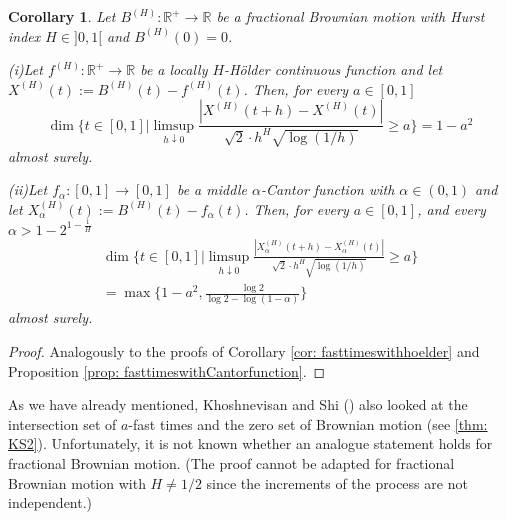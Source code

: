 \documentclass[11pt, reqno]{amsart}
\theoremstyle{plain}
\newtheorem{corollary}[theorem]{Corollary}
\theoremstyle{definition}
\theoremstyle{remark}
\begin{document}
\begin{corollary}
Let $B^{(H)} \colon \mathbb{R}^+ \to \mathbb{R}$ be a fractional Brownian motion with Hurst index $H\in]0,1[$ and $B^{(H)}(0)=0$.

(i)Let $f^{(H)} \colon \mathbb{R}^+ \to \mathbb{R}$ be a locally $H$-{H\"{o}lder } continuous function and let $X^{(H)}(t):= B^{(H)}(t)-f^{(H)}(t)$. Then, for every $a\in[0,1]$
\[
\dim \Big\{ t\in[0,1] \Big| \limsup_{h \downarrow 0} \frac{|X^{(H)}(t+h)-X^{(H)}(t)|}{\sqrt{2}\cdot h^{H}\sqrt{\log{(1/h)}}} \geq a \Big\} = 1-a^2
\]
almost surely.

(ii)Let $f_\alpha \colon [0,1] \to [0,1]$ be a middle $\alpha$-Cantor function with $\alpha \in(0,1)$ and let $X^{(H)}_\alpha(t):= B^{(H)}(t)-f_\alpha(t)$. Then, for every $a\in[0,1]$, and every $\alpha > 1 - 2^{1- \frac{1}{H}}$
\begin{multline*}
\dim \Big\{ t\in[0,1] \Big| \limsup_{h \downarrow 0} \frac{|X^{(H)}_\alpha(t+h)-X^{(H)}_\alpha(t)|}{\sqrt{2}\cdot h^{H}\sqrt{\log{(1/h)}}} \geq a \Big\} \\ = \max\Big\{1-a^2, \frac{\log2}{\log2-\log(1-\alpha)}\Big\}
\end{multline*}
almost surely.
\end{corollary}
\begin{proof}
Analogously to the proofs of Corollary \ref{cor: fasttimeswithhoelder} and Proposition \ref{prop: fasttimeswithCantorfunction}.
\end{proof}

As we have already mentioned, Khoshnevisan and Shi (\cite{KS}) also looked at the intersection set of $a$-fast times and the zero set of Brownian motion (see \ref{thm: KS2}). Unfortunately, it is not known whether an analogue statement holds for fractional Brownian motion.
(The proof cannot be adapted for fractional Brownian motion with $H \neq 1/2$ since the increments of the process are not independent.)
\end{document}

